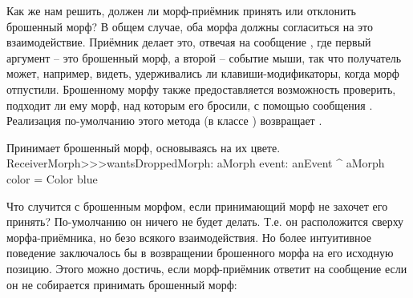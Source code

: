 \documentclass[a4paper,10pt,twoside]{book}
\begin{document}
Как же нам решить, должен ли морф-приёмник принять или отклонить брошенный морф?
В общем случае, оба морфа должны согласиться на это взаимодействие.
Приёмник делает это, отвечая на сообщение , где первый аргумент -- это брошенный морф, а второй -- событие мыши, так что получатель может, например, видеть, удерживались ли клавиши-модификаторы, когда морф отпустили.
Брошенному морфу также предоставляется возможность проверить, подходит ли ему морф, над которым его бросили, с помощью сообщения . Реализация по-умолчанию этого метода (в классе ) возвращает .

\begin{method}{Принимает брошенный морф, основываясь на их цвете.}
ReceiverMorph>>>wantsDroppedMorph: aMorph event: anEvent
	^ aMorph color = Color blue
\end{method}

Что случится с брошенным морфом, если принимающий морф не захочет его принять? По-умолчанию он ничего не будет делать. Т.е. он расположится сверху морфа-приёмника, но безо всякого взаимодействия. Но более интуитивное поведение заключалось бы в возвращении брошенного морфа на его исходную позицию. Этого можно достичь, если морф-приёмник ответит  на сообщение  если он не собирается принимать брошенный морф:
\end{document}

